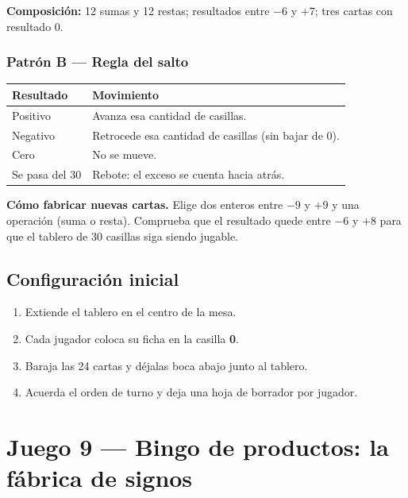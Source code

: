 \documentclass[12pt, letterpaper]{article}
\begin{document}
\textbf{Composición:} 12 sumas y 12 restas; resultados entre $-6$ y $+7$; tres cartas con resultado $0$.

\subsubsection{Patrón B — Regla del salto}

\begin{center}
\small
\begin{tabular}{@{}p{5.2cm} p{9cm}@{}}
\toprule
\textbf{Resultado} & \textbf{Movimiento}\\
\midrule
Positivo & Avanza esa cantidad de casillas.\\
Negativo & Retrocede esa cantidad de casillas (sin bajar de 0).\\
Cero & No se mueve.\\
Se pasa del 30 & Rebote: el exceso se cuenta hacia atrás.\\
\bottomrule
\end{tabular}
\end{center}

\begin{cuadroadvertencia}
\textbf{Cómo fabricar nuevas cartas.} Elige dos enteros entre $-9$ y $+9$ y una operación (suma o resta). Comprueba que el resultado quede entre $-6$ y $+8$ para que el tablero de 30 casillas siga siendo jugable.
\end{cuadroadvertencia}

\subsection{Configuración inicial}

\begin{enumerate}[leftmargin=*]
  \item Extiende el tablero en el centro de la mesa.
  \item Cada jugador coloca su ficha en la casilla \textbf{0}.
  \item Baraja las 24 cartas y déjalas boca abajo junto al tablero.
  \item Acuerda el orden de turno y deja una hoja de borrador por jugador.
\end{enumerate}

\clearpage
\section{Juego 9 — Bingo de productos: la fábrica de signos}
\end{document}
